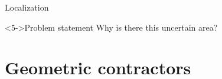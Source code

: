 \documentclass[10pt, xcolor={usenames, dvipsnames}]{beamer}
\begin{document}
        \begin{frame}{Localization}
            \begin{minipage}[t]{.45\textwidth}
                \vspace{-4mm}
                \centering
                \begin{figure}
                    \begin{overprint}
                        \centerline{}
                        \centerline{}
                        \centerline{}
                    \end{overprint}
                    \caption{}
               \end{figure}
            \end{minipage}%
            \hfill
            \begin{minipage}[t]{.55\textwidth}
                \centering
                \vspace{-5mm}
                \begin{alertblock}<5->{Problem statement}
                    Why is there this uncertain area?
                \end{alertblock}
            \end{minipage}
        \end{frame}

    \section{Geometric contractors}
\end{document}
